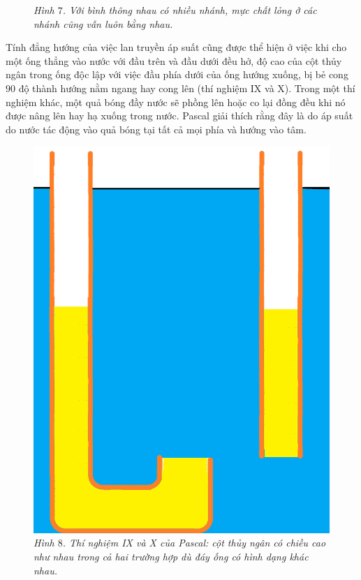 \begin{multicols}{2}
\begin{figure}[H]
		\caption{\small\textit{\color{timhieukhoahoc}Hình $7$. Với bình thông nhau có nhiều nhánh, mực chất lỏng ở các nhánh cũng vẫn luôn bằng nhau.}}
		\vspace*{-10pt}
	\end{figure}
	Tính đẳng hướng của việc lan truyền áp suất cũng được thể hiện ở việc khi cho một ống thẳng vào nước với đầu trên và đầu dưới đều hở, độ cao của cột thủy ngân trong ống độc lập với việc đầu phía dưới của ống hướng xuống, bị bẻ cong $90$ độ thành hướng nằm ngang hay cong lên (thí nghiệm IX và X). Trong một thí nghiệm khác, một quả bóng đầy nước sẽ phồng lên hoặc co lại đồng đều khi nó được nâng lên hay hạ xuống trong nước. Pascal giải thích rằng đây là do áp suất do nước tác động vào quả bóng tại tất cả mọi phía và hướng vào tâm.
	\begin{figure}[H]
		\vspace*{-10pt}
		\centering
		\captionsetup{labelformat= empty, justification=centering}
		\includegraphics[width= 0.65\linewidth]{10}
		\caption{\small\textit{\color{timhieukhoahoc}Hình $8$. Thí nghiệm IX và X của Pascal: cột thủy ngân có chiều cao như nhau trong cả hai trường hợp dù đáy ống có hình dạng khác nhau.}}
		\vspace*{-10pt}
	\end{figure}
	\begin{figure}[H]
		\vspace*{-10pt}
		\centering
		\captionsetup{labelformat= empty, justification=centering}

\end{figure}
\end{multicols}
